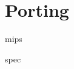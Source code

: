 \documentclass[../xdudla00-porting-Tang-to-Open-WRT.tex]{subfiles}
\begin{document}
\chapter{Porting}\label{porting}


mips


spec
\end{document}
